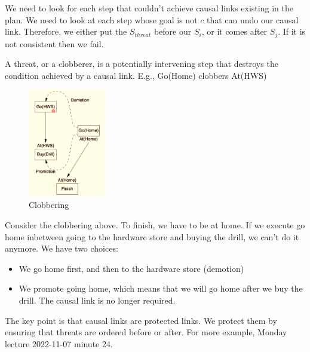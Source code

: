 \documentclass[a4paper]{article}
\theoremstyle{plain}
\theoremstyle{definition}
\newtheorem{defn}{Definition}[section]
\theoremstyle{remark}
\begin{document}
We need to look for each step that couldn't achieve causal links existing in the plan. We need to look at each step whose goal is not $c$ that can undo our causal link. Therefore, we either put the $S_{threat}$ before our $S_i$, or it comes after $S_j$. If it is not consistent then we fail.
\begin{tcolorbox}[colback=black!3!white,colframe=black!60!white,title=\begin{defn}Clobbering \label{Clobbering}\end{defn}]
A threat, or a clobberer, is a potentially intervening step that destroys the condition achieved by a causal link. E.g., Go(Home) clobbers At(HWS)
\begin{figure}[H]
	\centering
	\includegraphics[width=0.3\textwidth]{zz.png}
	\caption{Clobbering}
	\label{fig:zz-png}
\end{figure}
Consider the clobbering above. To finish, we have to be at home. If we execute go home inbetween going to the hardware store and buying the drill, we can't do it anymore. We have two choices:
\begin{itemize}
	\item We go home first, and then to the hardware store (demotion)
	\item We promote going home, which means that we will go home after we buy the drill. The causal link is no longer required.
\end{itemize}
\end{tcolorbox}
The key point is that causal links are protected links. We protect them by ensuring that threats are ordered before or after. For more example, Monday lecture 2022-11-07 minute 24.
\end{document}
